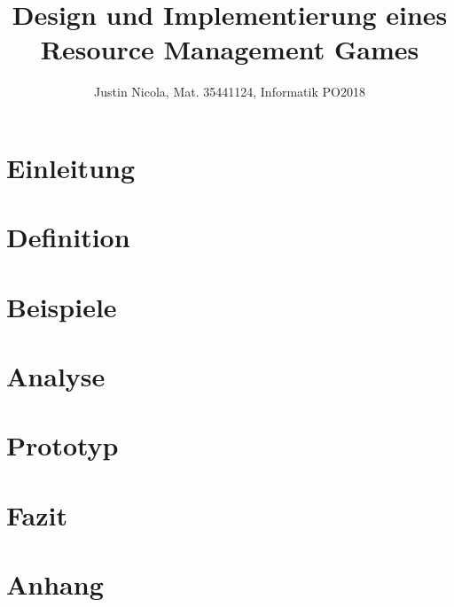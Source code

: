 \documentclass[12pt]{extarticle}
\title{Design und Implementierung eines Resource Management Games}
\author{Justin Nicola, Mat. 35441124, Informatik PO2018}
\begin{document}






\maketitle
\section{Einleitung}


\section{Definition}


\section{Beispiele}


\section{Analyse}


\section{Prototyp}


\section{Fazit}



\newpage
\printbibliography

\newpage



\section{Anhang}

\end{document}
